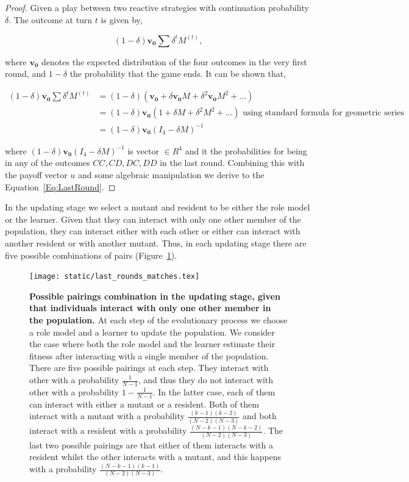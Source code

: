 \documentclass[11pt]{article}
\theoremstyle{plainCl1}
\theoremstyle{plainCl2}
\begin{document}
\begin{proof}
Given a play between two reactive strategies with continuation probability
$\delta$. The outcome at turn \(t\) is given by,

\begin{equation}\label{eq:}
  (1 - \delta) \mathbf{v_0} \sum \delta^{t} M^{(t)},
\end{equation}

where $\mathbf{v_0}$ denotes the expected distribution of the four outcomes in
the very first round, and \(1- \delta\) the probability that the game ends. It
can be shown that,

\begin{align*}
  (1 - \delta) \mathbf{v_0} \sum \delta^{t} M^{(t)} & = (1 - \delta)(\mathbf{v_0} + \delta \mathbf{v_0} M + \delta^{2}\mathbf{v_0} M ^{2} + \dots )\\ 
   & = (1 - \delta)\mathbf{v_0} (1 + \delta M + \delta^{2}M ^{2} + \dots ) \text{ using standard formula for geometric series}\\ 
   & = (1 - \delta)\mathbf{v_0}(I_4 - \delta M)^{-1}
\end{align*}

where \((1 - \delta)\mathbf{v_0}(I_4 - \delta M)^{-1}\) is vector \(\in R^{4}\)
and it the probabilities for being in any of the outcomes \(CC, CD, DC, DD\) in
the last round. Combining this with the payoff vector \(u\) and some algebraic
manipulation we derive to the Equation~\ref{Eq:LastRound}.
\end{proof}

In the updating stage we select a mutant and resident to be either the role
model or the learner. Given that they can interact with only one other member of
the population, they can interact either with each other or either can interact
with another resident or with another mutant. Thus, in each updating stage there
are five possible combinations of pairs (Figure~\ref{fig:single_pairs}).

\begin{figure}[!htbp]
  \centering
  \texttt{[image: static/last\_rounds\_matches.tex]}
  \caption{\textbf{Possible pairings combination in the updating stage, given
  that individuals interact with only one other member in the population.} At
  each step of the evolutionary process we choose a role model and a learner to
  update the population. We consider the case where both the role model and the
  learner estimate their fitness after interacting with a single member of the
  population. There are five possible pairings at each step. They interact with
  other with a probability \(\frac{1}{N - 1}\), and thus they do not interact
  with other with a probability \(1 - \frac{1}{N - 1}\). In the latter case,
  each of them can interact with either a mutant or a resident. Both of them
  interact with a mutant with a probability $\frac{(k-1)(k-2)}{(N-2)(N-3)}$ and
  both interact with a resident with a probability
  $\frac{(N-k-1)(N-k-2)}{(N-2)(N-3)}$. The last two possible pairings are that
  either of them interacts with a resident whilst the other interacts with a
  mutant, and this happens with a probability
  $\frac{(N-k-1)(k-1)}{(N-2)(N-3)}$.}
  \label{fig:single_pairs}
\end{figure}
\end{document}
